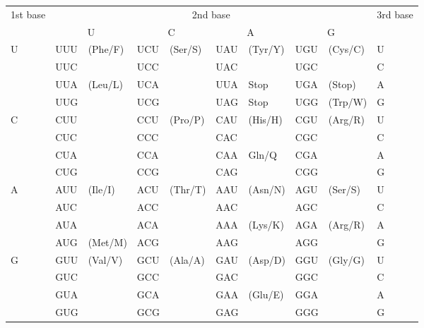
\renewcommand{\arraystretch}{1.25}
\begin{tabular}{ |l| l l|l l| l l|l l|l| }
  \hline
  \multirow{2}{2em}{1st base} &
  \multicolumn{8}{|c|}{2nd base} &
  \multirow{2}{2em}{3rd base} \\
  \cline{2-9}
  &
  \multicolumn{2}{|c|}{U} &
  \multicolumn{2}{|c|}{C} &
  \multicolumn{2}{|c|}{A} &
  \multicolumn{2}{|c|}{G} & \\
  \hline
  \multirow{4}{2em}{U} & 
  UUU & \multirow{2}{4em}{\tiny (Phe/F)} &
  UCU & \multirow{4}{4em}{\tiny (Ser/S)} &
  UAU & \multirow{2}{4em}{\tiny (Tyr/Y)} &
  UGU & \multirow{2}{4em}{\tiny (Cys/C)} & U \\
  & UUC & & UCC & & UAC & & UGC & & C \\ \cline{2-3} \cline{6-9}
  & UUA & \multirow{6}{4em}{\tiny (Leu/L)} 
  & UCA & & UUA & Stop & UGA & (Stop) & A \\ \cline{8-9}
  & UUG & & UCG & & UAG & Stop & UGG & \tiny (Trp/W) & G \\ \cline{4-9} 
  \cline{1-1}
  \multirow{4}{2em}{C}
  & CUU & & CCU & \multirow{4}{4em}{(Pro/P)} & CAU & \multirow{2}{4em}{(His/H)} & CGU & \multirow{4}{4em}{(Arg/R)} & U \\
  & CUC & & CCC & & CAC & & CGC & & C \\ \cline{6-7}
  & CUA & & CCA & & CAA & \multirow{2}{4em}{Gln/Q} & CGA & & A \\
  & CUG & & CCG & & CAG & & CGG & & G \\ \cline{1-9}
  \multirow{4}{2em}{A}
  & AUU & \multirow{3}{4em}{(Ile/I)} & ACU & \multirow{4}{4em}{(Thr/T)} & AAU 
  & \multirow{2}{4em}{(Asn/N)} & AGU & \multirow{2}{4em}{(Ser/S)} & U \\
  & AUC & & ACC & & AAC & & AGC & & C \\ \cline{6-9}
  & AUA & & ACA & & AAA & \multirow{2}{4em}{(Lys/K)} & AGA & \multirow{2}{4em}{(Arg/R)} & A \\
  \cline{2-3}
  & AUG & (Met/M) & ACG & & AAG & & AGG & & G \\ \cline{1-9}
  \multirow{4}{4em}{G}
  & GUU & \multirow{4}{4em}{(Val/V)} & GCU & \multirow{4}{4em}{(Ala/A)} 
  & GAU & \multirow{2}{4em}{(Asp/D)} & GGU & \multirow{4}{4em}{(Gly/G)} & U \\
  & GUC & & GCC & & GAC & & GGC & & C \\ \cline{6-7}
  & GUA & & GCA & & GAA & \multirow{2}{4em}{(Glu/E)} & GGA & & A \\
  & GUG & & GCG & & GAG & & GGG & & G \\ \hline
\end{tabular}
